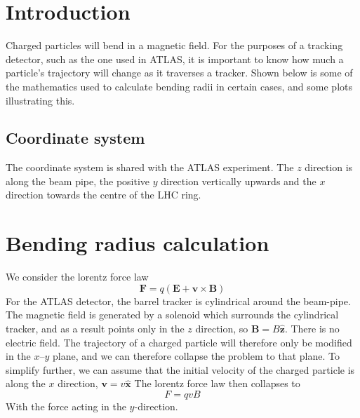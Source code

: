 \documentclass[a4paper, 12pt]{article}
\begin{document}
\section{Introduction}
Charged particles will bend in a magnetic field. 
For the purposes of a tracking detector, such as the one used in ATLAS, it is important to know how much a particle's trajectory will change as it traverses a tracker. 
Shown below is some of the mathematics used to calculate bending radii in certain cases, and some plots illustrating this.  

\subsection{Coordinate system}
The coordinate system is shared with the ATLAS experiment. 
The $z$ direction is along the beam pipe, the positive $y$ direction vertically upwards and the $x$ direction towards the centre of the LHC ring. 

\section{Bending radius calculation}
We consider the lorentz force law
\begin{equation}
  \mathbf{F} = q( \mathbf{E} + \mathbf{v} \times \mathbf{B})
\end{equation}
For the ATLAS detector, the barrel tracker is cylindrical around the beam-pipe. 
The magnetic field is generated by a solenoid which surrounds the cylindrical tracker, and as a result points only in the $z$ direction, so 
$\mathbf{B} = B \mathbf{\hat{z}}$. 
There is no electric field. 
The trajectory of a charged particle will therefore only be modified in the $x$--$y$ plane, and we can therefore collapse the problem to that plane. 
To simplify further, we can assume that the initial velocity of the charged particle is along the $x$ direction, $\mathbf{v} = v \mathbf{\hat{x}}$
The lorentz force law then collapses to
\begin{equation}
  F  = qvB
\end{equation}
With the force acting in the $y$-direction. 
\end{document}
